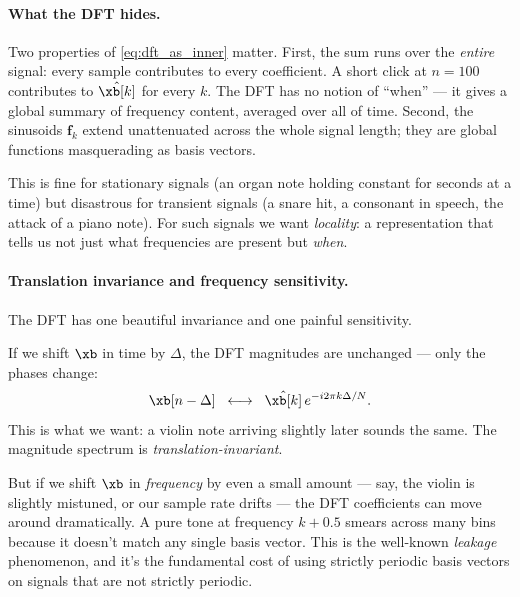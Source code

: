 \paragraph{What the DFT hides.}  Two properties of \eqref{eq:dft_as_inner}
matter.  First, the sum runs over the \emph{entire} signal: every sample
contributes to every coefficient.  A short click at $n = 100$
contributes to $\hat\xb[k]$ for every $k$.  The DFT has no notion of
``when'' --- it gives a global summary of frequency content, averaged
over all of time.  Second, the sinusoids $\mathbf{f}_k$ extend
unattenuated across the whole signal length; they are global functions
masquerading as basis vectors.

This is fine for stationary signals (an organ note holding constant for
seconds at a time) but disastrous for transient signals (a snare hit,
a consonant in speech, the attack of a piano note).  For such signals
we want \emph{locality}: a representation that tells us not just what
frequencies are present but \emph{when}.

\paragraph{Translation invariance and frequency sensitivity.}
The DFT has one beautiful invariance and one painful sensitivity.

If we shift $\xb$ in time by $\Delta$, the DFT magnitudes are
unchanged --- only the phases change:
\begin{equation}
    \xb[n - \Delta] \;\;\longleftrightarrow\;\;
    \hat\xb[k] \, e^{-i 2 \pi k \Delta / N}.
\end{equation}
This is what we want: a violin note arriving slightly later sounds the
same.  The magnitude spectrum is \emph{translation-invariant}.

But if we shift $\xb$ in \emph{frequency} by even a small amount --- say,
the violin is slightly mistuned, or our sample rate drifts ---
the DFT coefficients can move around dramatically.  A pure tone at
frequency $k + 0.5$ smears across many bins because it doesn't match
any single basis vector.  This is the well-known \emph{leakage}
phenomenon, and it's the fundamental cost of using strictly periodic
basis vectors on signals that are not strictly periodic.


